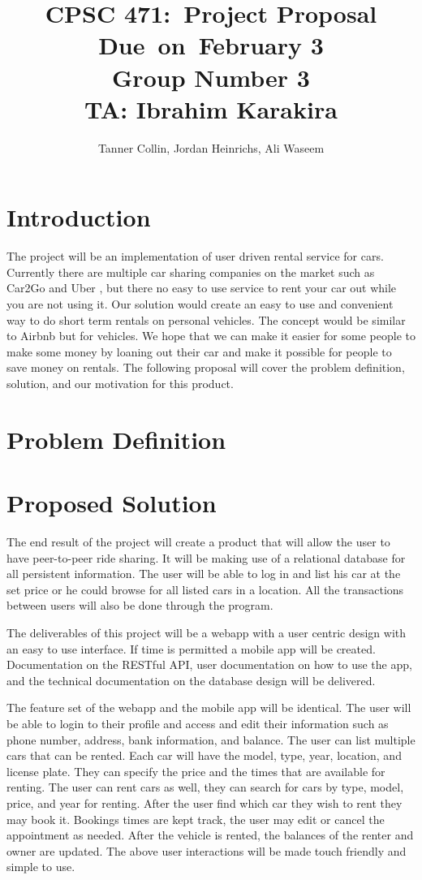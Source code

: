 \documentclass{article}
\title{
\vspace{2in}
\textmd{\textbf{CPSC 471:\ Project Proposal}}\\
\normalsize\vspace{0.1in}\small{Due\ on\ February 3 \\ Group Number 3 \\ TA: Ibrahim Karakira}\\
\vspace{3in}
}
\author{Tanner Collin, Jordan Heinrichs, Ali Waseem}
\date{}
\begin{document}
\maketitle
\newpage

\section{Introduction}
The project will be an implementation of user driven rental service for cars.
Currently there are multiple car sharing companies on the market such as Car2Go \cite{car2go}
and Uber \cite{uber}, but there no easy to use service to rent your car out while you are not using it.
Our solution would create an easy to use and convenient way to do short term rentals on personal vehicles. The concept would be similar to Airbnb \cite{airbnb} but for vehicles.
We hope that we can make it easier for some people to make some money by loaning out their car and make it possible for people to save money on rentals.
The following proposal will cover the problem definition, solution, and our motivation for this product.

\section{Problem Definition}
\section{Proposed Solution}
The end result of the project will create a product that will allow the user to have peer-to-peer ride sharing. It will be making use of a relational database for all persistent information.
The user will be able to log in and list his car at the set price or he could browse for all listed cars in a location.
All the transactions between users will also be done through the program.

The deliverables of this project will be a webapp with a user centric design with an easy to use interface. If time is permitted a mobile app will be created. Documentation on the RESTful API, user documentation on how to use the app, and the technical documentation on the database design will be delivered.

The feature set of the webapp and the mobile app will be identical.
The user will be able to login to their profile and access and edit their information such as phone number, address, bank information, and balance.
The user can list multiple cars that can be rented. Each car will have the model, type, year, location, and license plate. They can specify the price and the times that are available for renting.
The user can rent cars as well, they can search for cars by type, model, price, and year for renting. After the user find which car they wish to rent they may book it.
Bookings times are kept track, the user may edit or cancel the appointment as needed.
After the vehicle is rented, the balances of the renter and owner are updated.
The above user interactions will be made touch friendly and simple to use.
\end{document}
